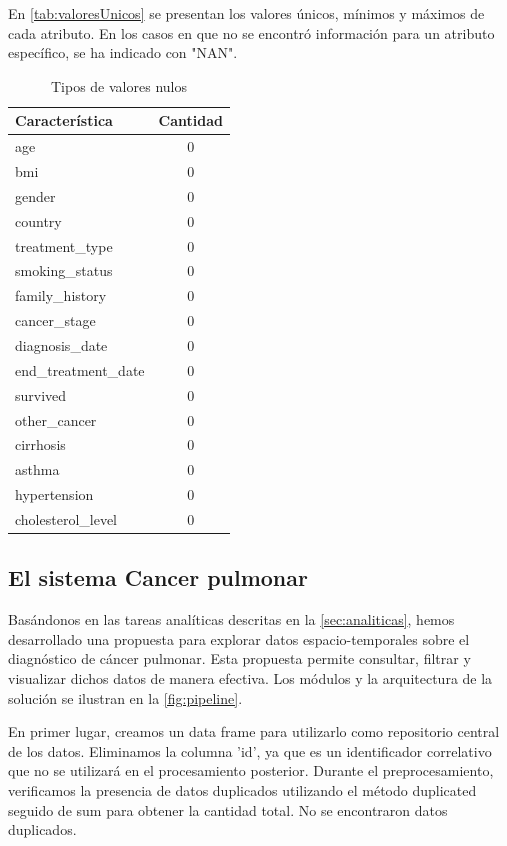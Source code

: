 \documentclass[10pt,journal,compsoc]{IEEEtran}
\begin{document}
 En \autoref{tab:valoresUnicos} se presentan los valores únicos, mínimos y máximos de cada atributo. En los casos en que no se encontró información para un atributo específico, se ha indicado con "NAN".

\begin{table}[h!]
\centering
\begin{tabular}{|l|c|}
\hline
\textbf{Característica}   & \textbf{Cantidad}  \\ \hline
age                     &  0 \\ \hline
bmi                     &  0 \\ \hline
gender                  &  0 \\ \hline
country                 &  0 \\ \hline
treatment\_type         &  0 \\ \hline
smoking\_status         &  0 \\ \hline
family\_history         &  0 \\ \hline
cancer\_stage           &  0 \\ \hline
diagnosis\_date         &  0 \\ \hline
end\_treatment\_date    &  0 \\ \hline
survived                &  0 \\ \hline
other\_cancer           &  0 \\ \hline
cirrhosis               &  0 \\ \hline
asthma                  &  0 \\ \hline
hypertension            &  0 \\ \hline
cholesterol\_level      &  0 \\ \hline
\end{tabular}
\caption{Tipos de valores nulos}
\label{tab:valoresNulos}
\end{table}



\subsection{El sistema Cancer pulmonar}
Basándonos en las tareas analíticas descritas en la  \autoref{sec:analiticas}, hemos desarrollado una propuesta para explorar datos espacio-temporales sobre el diagnóstico de cáncer pulmonar. Esta propuesta permite consultar, filtrar y visualizar dichos datos de manera efectiva. Los módulos y la arquitectura de la solución se ilustran en la \autoref{fig:pipeline}.

En primer lugar, creamos un data frame para utilizarlo como repositorio central de los datos. Eliminamos la columna 'id', ya que es un identificador correlativo que no se utilizará en el procesamiento posterior. Durante el preprocesamiento, verificamos la presencia de datos duplicados utilizando el método duplicated seguido de sum para obtener la cantidad total. No se encontraron datos duplicados.
\end{document}
